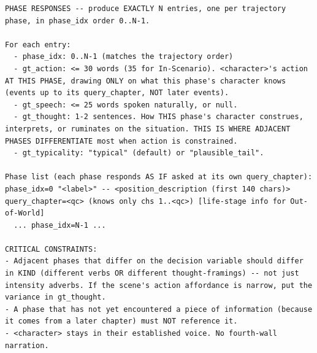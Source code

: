 \documentclass{llmxive}
\begin{document}
\begin{table}[htbp]
\centering
\begin{lstlisting}[basicstyle=\ttfamily\scriptsize]
PHASE RESPONSES -- produce EXACTLY N entries, one per trajectory phase, in phase_idx order 0..N-1.

For each entry:
  - phase_idx: 0..N-1 (matches the trajectory order)
  - gt_action: <= 30 words (35 for In-Scenario). <character>'s action AT THIS PHASE, drawing ONLY on what this phase's character knows (events up to its query_chapter, NOT later events).
  - gt_speech: <= 25 words spoken naturally, or null.
  - gt_thought: 1-2 sentences. How THIS phase's character construes, interprets, or ruminates on the situation. THIS IS WHERE ADJACENT PHASES DIFFERENTIATE most when action is constrained.
  - gt_typicality: "typical" (default) or "plausible_tail".

Phase list (each phase responds AS IF asked at its own query_chapter): phase_idx=0 "<label>" -- <position_description (first 140 chars)> query_chapter=<qc> (knows only chs 1..<qc>) [life-stage info for Out-of-World]
  ... phase_idx=N-1 ...

CRITICAL CONSTRAINTS:
- Adjacent phases that differ on the decision variable should differ in KIND (different verbs OR different thought-framings) -- not just intensity adverbs. If the scene's action affordance is narrow, put the variance in gt_thought.
- A phase that has not yet encountered a piece of information (because it comes from a later chapter) must NOT reference it.
- <character> stays in their established voice. No fourth-wall narration.
\end{lstlisting}
\caption{Shared phase-response instructions (\texttt{\_phase\_response\_instructions}). Inlined verbatim into the user message of the three probe designers.}
\label{tab:prompt-phase-instructions}
\end{table}
\end{document}
